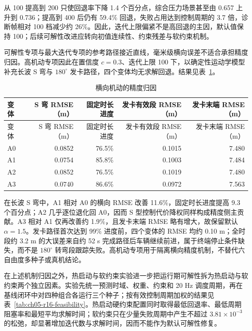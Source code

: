 从 100 提高到 200 只使回退率下降 1.4 个百分点，综合压力场景甚至由 0.657 上升到 0.736；提高到 400 后仍有 59.4\% 回退，失败占用达到控制周期的 3.7 倍，诊断帧相对 100 档减少约 26\%。因此，迭代上限偏紧不是高回退的主因，默认值保持 100；后续可解性改进应转向初值连续性、约束残差与软约束机制。

可解性专项与最大迭代专项的参考路径接近直线，毫米级横向误差不适合承担精度归因。高机动专项因此在置信度 \(c=0.3\)、迭代上限 100 下，以确定性运动学模型补充长波 S 弯与 \(180^\circ\) 发卡路径，四个变体均无求解回退。结果见表~\ref{tab:ch05-uampc-h4-maneuver}。

\begin{longtable}[]{@{}lrrrr@{}}
\caption{横向机动的精度归因}\label{tab:ch05-uampc-h4-maneuver}\tabularnewline
\toprule\noalign{}
变体 & S 弯 RMSE（m） & 固定时长进度 & 发卡有效段 RMSE（m） & 发卡末端 RMSE（m） \\
\midrule\noalign{}
\endfirsthead
\toprule\noalign{}
变体 & S 弯 RMSE（m） & 固定时长进度 & 发卡有效段 RMSE（m） & 发卡末端 RMSE（m） \\
\midrule\noalign{}
\endhead
\bottomrule\noalign{}
\endlastfoot
A0 & 0.0852 & 76.5\% & 0.1015 & 7.480 \\
A1 & 0.0754 & 85.8\% & 0.1003 & 7.484 \\
A2 & 0.0852 & 76.5\% & 0.1019 & 7.480 \\
A3 & 0.0740 & 86.6\% & 0.0972 & 7.563 \\
\end{longtable}

在长波 S 弯中，A1 相对 A0 的横向 RMSE 改善 11.6\%，固定时长进度提高 9.3 个百分点；A2 几乎逐位退化回 A0，因而 S 型控制代价降权同样构成精度侧主贡献。A3 相对 A1 仅再改善约 1.9\%，且发卡末端 RMSE 略有增大，故保留默认 \(\alpha=1.5\)。发卡路径首次达到 99\% 进度前，四个变体的 RMSE 均约 0.10 m；全时段约 3.2 m 的大误差来自约 52 s 完成路径后车辆继续前进，属于终端停止条件缺失，而不是 \(180^\circ\) 转弯段跟踪失败。高机动专项用于隔离横向精度机制，不替代六自由度多种子或真机结论。

在上述机制归因之外，热启动与软约束实验进一步把运行期可解性拆为热启动与软约束两个独立因素。实验先统一预测时域、权重、约束和 20 Hz 调度周期，再在基线闭环中对四种组合各运行三个种子；按有效控制周期加权的结果见表~\ref{tab:ch05-r16-feasibility}。热启动硬约束配置同时取得最低回退率、最低周期阻塞率和最短平均求解时间；软约束只在少量失败周期中产生不超过 \(3.81\times10^{-3}\) 的松弛，却显著增加迭代数与求解时间，因而不能作为默认可解性修复。


